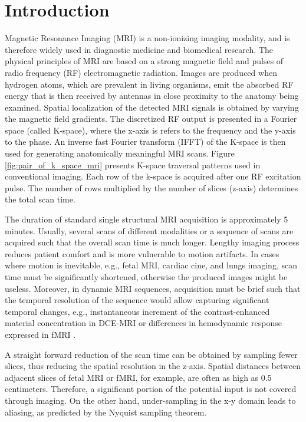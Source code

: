 \documentclass[review]{elsarticle}
\begin{document}
\linenumbers

\section{Introduction}
Magnetic Resonance Imaging (MRI) is a non-ionizing imaging modality, and is therefore widely used in diagnostic medicine and biomedical research. The physical principles of MRI are based on a strong magnetic field and pulses of radio frequency (RF) electromagnetic radiation. 
Images are produced when hydrogen atoms, which are prevalent in living organisms, emit the absorbed RF energy that is then received by antennas in close proximity to the anatomy being examined. Spatial localization of the detected MRI signals is obtained by varying the magnetic field gradients. The discretized RF output is presented in a Fourier space
(called K-space), where the x-axis is refers to the frequency and the y-axis to the phase. An inverse fast Fourier transform (IFFT) of the K-space is then used for generating anatomically meaningful MRI scans. Figure \ref{fig:pair_of_k_space_mri} presents K-space traversal patterns used in conventional imaging. Each row of the k-space is acquired after one RF excitation pulse. The number of rows multiplied by the number of slices (z-axis) determines the total scan time.

The duration of standard single structural MRI acquisition is approximately 5 minutes. Usually, several scans of different modalities or a sequence of scans are acquired such that the overall scan time is much longer. Lengthy imaging process reduces patient comfort and is more vulnerable to motion artifacts. In cases where motion is inevitable, e.g., fetal MRI, cardiac cine, and lungs imaging, scan time must be significantly shortened, otherwise the produced images might be useless. Moreover, in dynamic MRI sequences, acquisition must be brief such that the temporal resolution of the sequence would allow capturing significant temporal changes, e.g., instantaneous increment of the contrast-enhanced material concentration in DCE-MRI or differences in hemodynamic response expressed in fMRI \cite{moeller2010multiband}.

A straight forward reduction of the scan time can be obtained by sampling fewer slices, thus reducing the spatial resolution in the z-axis. Spatial distances between adjacent slices of fetal MRI or fMRI, for example, are often as high as 0.5 centimeters. Therefore, a significant portion of the potential input is not covered through imaging. On the other hand, under-sampling in the x-y domain leads to aliasing, as predicted by the Nyquist sampling theorem.
\end{document}
